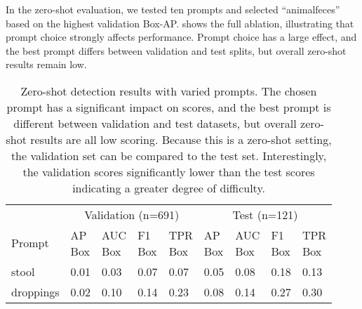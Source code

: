 In the zero-shot evaluation, we tested ten prompts and selected ``animalfeces'' based on the highest
  validation Box-AP.
 shows the full ablation, illustrating that prompt choice strongly affects
  performance.
Prompt choice has a large effect, and the best prompt differs between validation and test splits, but
  overall zero-shot results remain low.



\begin{table*}[t]
\caption{Zero-shot detection results with varied prompts. The chosen prompt has a significant impact on scores, and the best prompt is different between validation and test datasets, but overall zero-shot results are all low scoring. Because this is a zero-shot setting, the validation set can be compared to the test set. Interestingly, the validation scores significantly lower than the test scores indicating a greater degree of difficulty. }
\label{tab:prompt_variations}
\centering
\begin{tabular}{lllllllll}
\toprule
\multicolumn{1}{l}{} & \multicolumn{4}{c}{Validation (n=691)} & \multicolumn{4}{c}{Test (n=121)} \\
 Prompt      & \makecell{AP\\Box}   & \makecell{AUC\\Box}   & \makecell{F1\\Box}   & \makecell{TPR\\Box}   & \makecell{AP\\Box}   & \makecell{AUC\\Box}   & \makecell{F1\\Box}   & \makecell{TPR\\Box}   \\
\midrule
 stool       & 0.01                 & 0.03                  & 0.07                 & 0.07                  & 0.05                 & 0.08                  & 0.18                 & 0.13                  \\
 droppings   & 0.02                 & 0.10                  & 0.14                 & 0.23                  & 0.08                 & 0.14                  & 0.27                 & 0.30                  \\

\end{tabular}
\end{table*}
